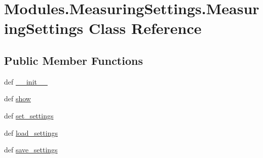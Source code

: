 \hypertarget{classModules_1_1MeasuringSettings_1_1MeasuringSettings}{\section{Modules.\-Measuring\-Settings.\-Measuring\-Settings Class Reference}
\label{classModules_1_1MeasuringSettings_1_1MeasuringSettings}
}
\subsection*{Public Member Functions}
\begin{DoxyCompactItemize}
\item 
def \hyperlink{classModules_1_1MeasuringSettings_1_1MeasuringSettings_adb29c44c6504cd21641e6ae5d798f09a}{\-\_\-\-\_\-init\-\_\-\-\_\-}
\item 
def \hyperlink{classModules_1_1MeasuringSettings_1_1MeasuringSettings_adabfc733f25e05e437e0ccce0eae8650}{show}
\item 
def \hyperlink{classModules_1_1MeasuringSettings_1_1MeasuringSettings_ad2e901d76a5d4669a1499ed5636cdd0d}{set\-\_\-settings}
\item 
def \hyperlink{classModules_1_1MeasuringSettings_1_1MeasuringSettings_a60c84b092228f9883120c0978a871cc0}{load\-\_\-settings}
\item 
def \hyperlink{classModules_1_1MeasuringSettings_1_1MeasuringSettings_ab500a34a003c16c8c8a7951d19b86c76}{save\-\_\-settings}
\end{DoxyCompactItemize}
